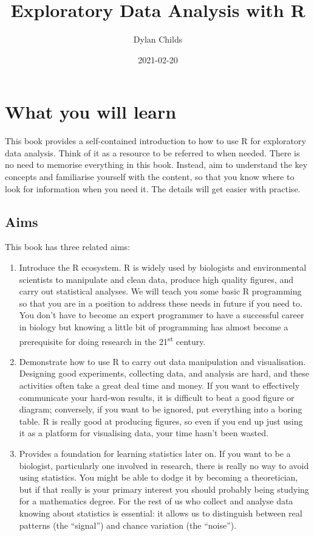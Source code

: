 \documentclass[
]{book}
\title{Exploratory Data Analysis with R}
\author{Dylan Childs}
\date{2021-02-20}
\begin{document}
\maketitle

{
\setcounter{tocdepth}{1}
\tableofcontents
}
\hypertarget{what-you-will-learn}{%
\chapter*{What you will learn}\label{what-you-will-learn}}

This book provides a self-contained introduction to how to use R for exploratory data analysis. Think of it as a resource to be referred to when needed. There is no need to memorise everything in this book. Instead, aim to understand the key concepts and familiarise yourself with the content, so that you know where to look for information when you need it. The details will get easier with practise.

\hypertarget{aims}{%
\section*{Aims}\label{aims}}

This book has three related aims:

\begin{enumerate}
\def\labelenumi{\arabic{enumi}.}
\item
  Introduce the R ecosystem. R is widely used by biologists and environmental scientists to manipulate and clean data, produce high quality figures, and carry out statistical analyses. We will teach you some basic R programming so that you are in a position to address these needs in future if you need to. You don't have to become an expert programmer to have a successful career in biology but knowing a little bit of programming has almost become a prerequisite for doing research in the 21\textsuperscript{st} century.
\item
  Demonstrate how to use R to carry out data manipulation and visualisation. Designing good experiments, collecting data, and analysis are hard, and these activities often take a great deal time and money. If you want to effectively communicate your hard-won results, it is difficult to beat a good figure or diagram; conversely, if you want to be ignored, put everything into a boring table. R is really good at producing figures, so even if you end up just using it as a platform for visualising data, your time hasn't been wasted.
\item
  Provides a foundation for learning statistics later on. If you want to be a biologist, particularly one involved in research, there is really no way to avoid using statistics. You might be able to dodge it by becoming a theoretician, but if that really is your primary interest you should probably being studying for a mathematics degree. For the rest of us who collect and analyse data knowing about statistics is essential: it allows us to distinguish between real patterns (the ``signal'') and chance variation (the ``noise'').
\end{enumerate}
\end{document}

